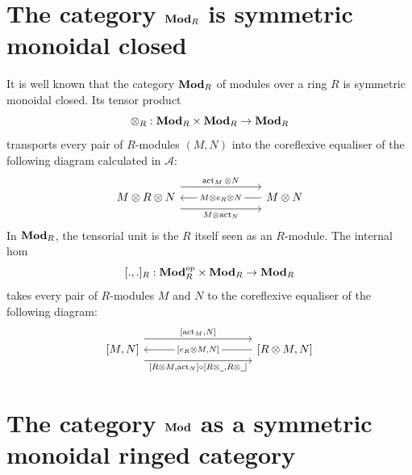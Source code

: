 \documentclass[8pt]{article}
\theoremstyle{definition}
\theoremstyle{definition}
\theoremstyle{definition}
\theoremstyle{definition}
\theoremstyle{definition}
\theoremstyle{definition}
\theoremstyle{definition}
\theoremstyle{definition}
\theoremstyle{definition}
\theoremstyle{definition}
\theoremstyle{definition}
\theoremstyle{definition}
\theoremstyle{definition}
\theoremstyle{definition}
\theoremstyle{question}
\begin{document}
\section{The category ${\bf Mod}_R$ is symmetric monoidal closed}

It is well known that the category ${\bf Mod}_R$ of modules over a ring $R$ is symmetric monoidal closed. Its tensor product
\[
\otimes_R : {\bf Mod}_R \times {\bf Mod}_R \to {\bf Mod}_R
\]
transports every pair of $R$-modules $(M,N)$ into the coreflexive equaliser of the following diagram calculated in $\mathcal{A}$:
\[
\begin{tikzcd}
  M \otimes R \otimes N \ar[rrr, shift left=4, "\operatorname{act}_M \otimes N"] \ar[rrr, shift right=4, "M \otimes \operatorname{act}_N"'] &&& M \otimes N \ar[lll, "M \otimes e_R \otimes N" description]
\end{tikzcd}
\]
In ${\bf Mod}_R$, the tensorial unit is the $R$ itself seen as an $R$-module. The internal hom
\[
  [.,.]_R : {\bf Mod}^{op}_R \times {\bf Mod}_R \to {\bf Mod}_R
\]
takes every pair of $R$-modules $M$ and $N$ to the coreflexive equaliser of the following diagram:
\[
\begin{tikzcd}
  {[M,N]} \ar[rrrr, shift left=4, "{[\operatorname{act}_M, N]}"] \ar[rrrr, shift right=4, "{[R \otimes M,\operatorname{act}_N]} \circ {[R \otimes \underline{\:\:},R \otimes \underline{\:\:}]}"'] &&&& {[R \otimes M, N]} \ar[llll, "{[e_R \otimes M, N]}" description]
\end{tikzcd}
\]

\section{The category ${\bf Mod}$ as a symmetric monoidal ringed category}
\end{document}
